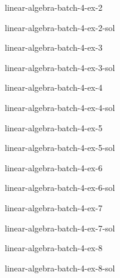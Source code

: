\documentclass[preview]{standalone}
\begin{document}
\begin{snippetexercise}{linear-algebra-batch-4-ex-2}{}
    \todo
\end{snippetexercise}

\begin{snippetsolution}{linear-algebra-batch-4-ex-2-sol}{}
    \todo
\end{snippetsolution}

\begin{snippetexercise}{linear-algebra-batch-4-ex-3}{}
    \todo
\end{snippetexercise}

\begin{snippetsolution}{linear-algebra-batch-4-ex-3-sol}{}
    \todo
\end{snippetsolution}

\begin{snippetexercise}{linear-algebra-batch-4-ex-4}{}
    \todo
\end{snippetexercise}

\begin{snippetsolution}{linear-algebra-batch-4-ex-4-sol}{}
    \todo
\end{snippetsolution}

\begin{snippetexercise}{linear-algebra-batch-4-ex-5}{}
    \todo
\end{snippetexercise}

\begin{snippetsolution}{linear-algebra-batch-4-ex-5-sol}{}
    \todo
\end{snippetsolution}

\begin{snippetexercise}{linear-algebra-batch-4-ex-6}{}
    \todo
\end{snippetexercise}

\begin{snippetsolution}{linear-algebra-batch-4-ex-6-sol}{}
    \todo
\end{snippetsolution}

\begin{snippetexercise}{linear-algebra-batch-4-ex-7}{}
    \todo
\end{snippetexercise}

\begin{snippetsolution}{linear-algebra-batch-4-ex-7-sol}{}
    \todo
\end{snippetsolution}

\begin{snippetexercise}{linear-algebra-batch-4-ex-8}{}
    \todo
\end{snippetexercise}

\begin{snippetsolution}{linear-algebra-batch-4-ex-8-sol}{}
    \todo
\end{snippetsolution}
\end{document}
